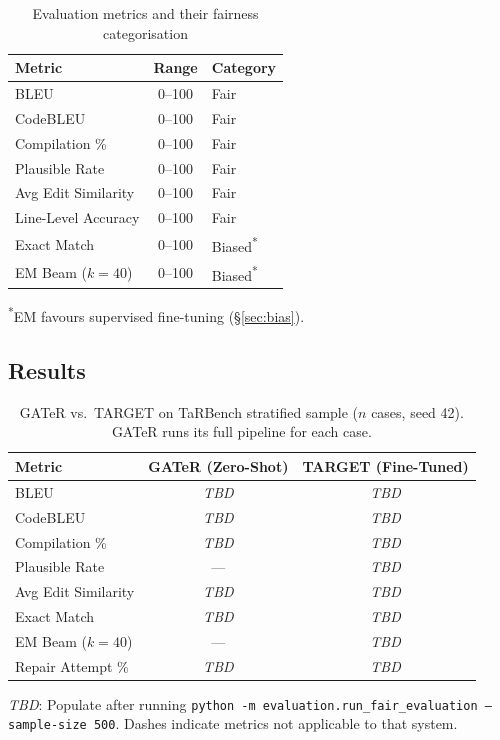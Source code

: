 \documentclass[conference,10pt]{IEEEtran}
\begin{document}
\begin{table}[h]
\centering
\caption{Evaluation metrics and their fairness categorisation}
\renewcommand{\arraystretch}{1.15}
\begin{tabular}{@{}lcl@{}}
\toprule
\textbf{Metric} & \textbf{Range} & \textbf{Category} \\
\midrule
BLEU                & 0--100 & Fair \\
CodeBLEU            & 0--100 & Fair \\
Compilation \%      & 0--100 & Fair \\
Plausible Rate      & 0--100 & Fair \\
Avg Edit Similarity & 0--100 & Fair \\
Line-Level Accuracy & 0--100 & Fair \\
Exact Match         & 0--100 & Biased\textsuperscript{*} \\
EM Beam ($k{=}40$)  & 0--100 & Biased\textsuperscript{*} \\
\bottomrule
\end{tabular}

\smallskip\footnotesize
\textsuperscript{*}EM favours supervised fine-tuning (\S\ref{sec:bias}).
\end{table}

\subsection{Results}

\begin{table}[h]
\centering
\caption{GATeR vs.\ TARGET on TaRBench stratified sample ($n$ cases, seed 42).
GATeR runs its full pipeline for each case.}
\renewcommand{\arraystretch}{1.2}
\begin{tabular}{@{}lcc@{}}
\toprule
\textbf{Metric} & \textbf{GATeR (Zero-Shot)} & \textbf{TARGET (Fine-Tuned)} \\
\midrule
BLEU              & \emph{TBD} & \emph{TBD} \\
CodeBLEU          & \emph{TBD} & \emph{TBD} \\
Compilation \%    & \emph{TBD} & \emph{TBD} \\
Plausible Rate    & ---         & \emph{TBD} \\
Avg Edit Similarity & \emph{TBD} & \emph{TBD} \\
Exact Match       & \emph{TBD} & \emph{TBD} \\
EM Beam ($k{=}40$) & ---        & \emph{TBD} \\
Repair Attempt \% & \emph{TBD} & \emph{TBD} \\
\bottomrule
\end{tabular}

\smallskip\footnotesize
\emph{TBD}: Populate after running
\texttt{python -m evaluation.run\_fair\_evaluation --sample-size 500}.
Dashes indicate metrics not applicable to that system.
\end{table}
\end{document}

